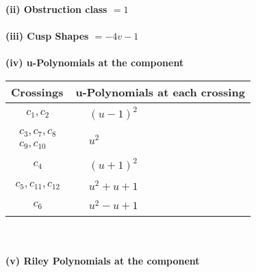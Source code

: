 \documentclass[1p]{elsarticle_modified}
\theoremstyle{definition}
\begin{document}
\flushleft \textbf{(ii) Obstruction class $= 1$}\\~\\
\flushleft \textbf{(iii) Cusp Shapes $= -4 v-1$}\\~\\
\newpage\renewcommand{\arraystretch}{1}
\flushleft \textbf{(iv) u-Polynomials at the component}\newline \\
\begin{tabular}{m{50pt}|m{274pt}}
Crossings & \hspace{64pt}u-Polynomials at each crossing \\
\hline $$\begin{aligned}c_{1},c_{2}\end{aligned}$$&$\begin{aligned}
&(u-1)^2
\end{aligned}$\\
\hline $$\begin{aligned}c_{3},c_{7},c_{8}\\c_{9},c_{10}\end{aligned}$$&$\begin{aligned}
&u^2
\end{aligned}$\\
\hline $$\begin{aligned}c_{4}\end{aligned}$$&$\begin{aligned}
&(u+1)^2
\end{aligned}$\\
\hline $$\begin{aligned}c_{5},c_{11},c_{12}\end{aligned}$$&$\begin{aligned}
&u^2+u+1
\end{aligned}$\\
\hline $$\begin{aligned}c_{6}\end{aligned}$$&$\begin{aligned}
&u^2- u+1
\end{aligned}$\\
\hline
\end{tabular}\\~\\
\newpage\renewcommand{\arraystretch}{1}
\flushleft \textbf{(v) Riley Polynomials at the component}\newline \\
\end{document}
